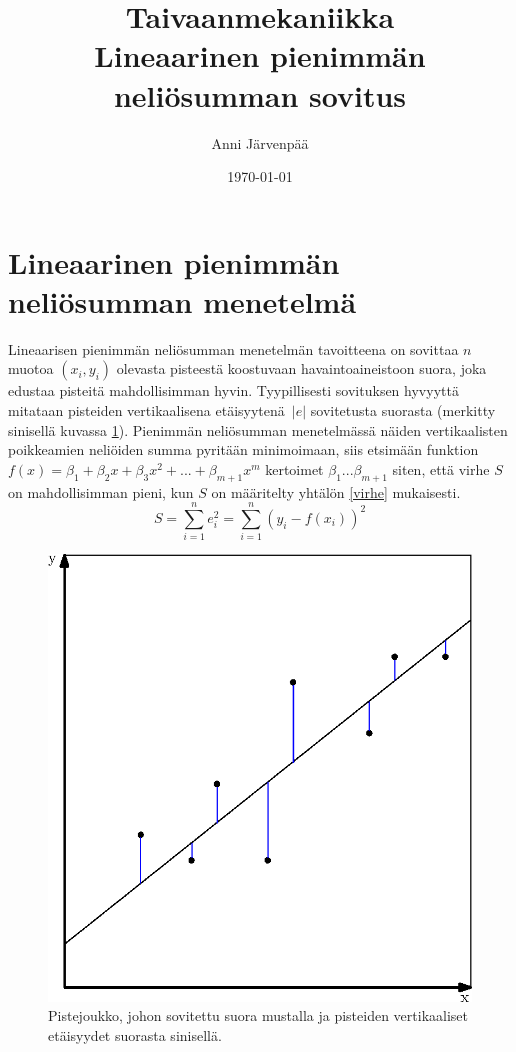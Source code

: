\documentclass[12pt,a4paper,titlepage]{article}
\title{Taivaanmekaniikka \\ Lineaarinen pienimmän neliösumman sovitus \vspace{0.5em}}
\author{\begin{tabular}{c}
Anni Järvenpää
\end{tabular}}
\date{\today}
\begin{document}
\maketitle

\newpage
\null
\thispagestyle{empty}
\addtocounter{page}{-1}
\newpage

\section{Lineaarinen pienimmän neliösumman menetelmä}
Lineaarisen pienimmän neliösumman menetelmän tavoitteena on sovittaa $n$ muotoa $(x_i, y_i)$ olevasta pisteestä koostuvaan havaintoaineistoon suora, joka edustaa pisteitä mahdollisimman hyvin. Tyypillisesti sovituksen hyvyyttä mitataan pisteiden vertikaalisena etäi\-syytenä~$|e|$ sovitetusta suorasta (merkitty sinisellä kuvassa \ref{vertikaalietaisyys}). Pienimmän neliösumman menetelmässä näiden vertikaalisten poikkeamien neliöiden summa pyritään minimoimaan, siis etsimään funktion $f(x) = \beta_1 + \beta_2 x + \beta_3 x^2 + ... + \beta_{m+1} x^m$ kertoimet $\beta_1 ... \beta_{m+1}$ siten, että virhe $S$ on mahdollisimman pieni, kun $S$ on määritelty yhtälön \ref{virhe} mukaisesti.~\cite{basicideas}
\begin{equation} \label{virhe}
	S = \sum\limits_{i=1}^{n} e_i^2 = \sum\limits_{i=1}^{n} (y_i - f(x_i))^2
\end{equation}

\begin{figure}
\centering
\includegraphics{vertikaalietaisyys.eps}
\caption{Pistejoukko, johon sovitettu suora mustalla ja pisteiden vertikaaliset etäisyydet suorasta sinisellä.}
\label{vertikaalietaisyys}
\end{figure}
\end{document}

